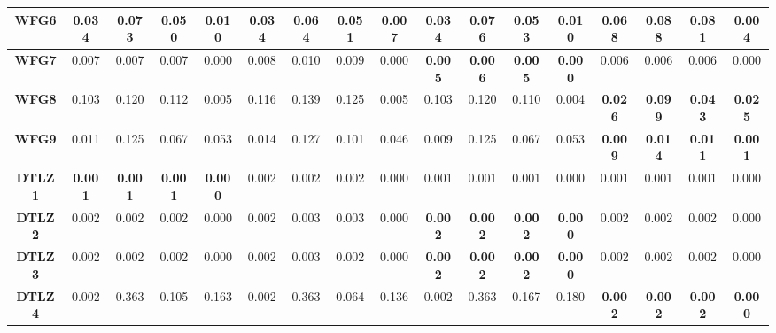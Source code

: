 \begin{table*}[t]
\begin{tabular}{cc|c|c|c|c|c|c|c|c|c|c|c|c|c|c|c}
\multicolumn{1}{c|}{\textbf{WFG6}}  & \textbf{0.034} & \textbf{0.073} & \textbf{0.050} & \textbf{0.010} & \textbf{0.034} & \textbf{0.064} & \textbf{0.051} & \textbf{0.007} & \textbf{0.034} & \textbf{0.076} & \textbf{0.053} & \textbf{0.010} & 0.068          & 0.088          & 0.081          & 0.004          \\ \hline
\multicolumn{1}{c|}{\textbf{WFG7}}  & 0.007          & 0.007          & 0.007          & 0.000          & 0.008          & 0.010          & 0.009          & 0.000          & \textbf{0.005} & \textbf{0.006} & \textbf{0.005} & \textbf{0.000} & 0.006          & 0.006          & 0.006          & 0.000          \\ \hline
\multicolumn{1}{c|}{\textbf{WFG8}}  & 0.103          & 0.120          & 0.112          & 0.005          & 0.116          & 0.139          & 0.125          & 0.005          & 0.103          & 0.120          & 0.110          & 0.004          & \textbf{0.026} & \textbf{0.099} & \textbf{0.043} & \textbf{0.025} \\ \hline
\multicolumn{1}{c|}{\textbf{WFG9}}  & 0.011          & 0.125          & 0.067          & 0.053          & 0.014          & 0.127          & 0.101          & 0.046          & 0.009          & 0.125          & 0.067          & 0.053          & \textbf{0.009} & \textbf{0.014} & \textbf{0.011} & \textbf{0.001} \\ \hline
\multicolumn{1}{c|}{\textbf{DTLZ1}} & \textbf{0.001} & \textbf{0.001} & \textbf{0.001} & \textbf{0.000} & 0.002          & 0.002          & 0.002          & 0.000          & 0.001          & 0.001          & 0.001          & 0.000          & 0.001          & 0.001          & 0.001          & 0.000          \\ \hline
\multicolumn{1}{c|}{\textbf{DTLZ2}} & 0.002          & 0.002          & 0.002          & 0.000          & 0.002          & 0.003          & 0.003          & 0.000          & \textbf{0.002} & \textbf{0.002} & \textbf{0.002} & \textbf{0.000} & 0.002          & 0.002          & 0.002          & 0.000          \\ \hline
\multicolumn{1}{c|}{\textbf{DTLZ3}} & 0.002          & 0.002          & 0.002          & 0.000          & 0.002          & 0.003          & 0.002          & 0.000          & \textbf{0.002} & \textbf{0.002} & \textbf{0.002} & \textbf{0.000} & 0.002          & 0.002          & 0.002          & 0.000          \\ \hline
\multicolumn{1}{c|}{\textbf{DTLZ4}} & 0.002          & 0.363          & 0.105          & 0.163          & 0.002          & 0.363          & 0.064          & 0.136          & 0.002          & 0.363          & 0.167          & 0.180          & \textbf{0.002} & \textbf{0.002} & \textbf{0.002} & \textbf{0.000} \\ \hline

\end{tabular}
\end{table*}
